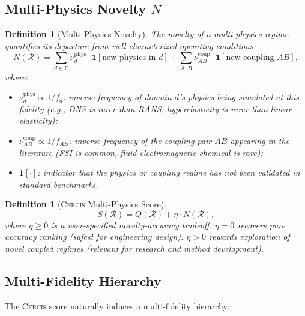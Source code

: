 \documentclass[11pt,a4paper]{article}
\newtheorem{definition}[theorem]{Definition}
\theoremstyle{definition}
\newcommand{\Cercis}{\textsc{Cercis}}
\newcommand{\ind}[1]{\mathbf{1}[#1]}
\newcommand{\domains}{\mathbb{D}}
\begin{document}
\subsection{Multi-Physics Novelty $N$}

\begin{definition}[Multi-Physics Novelty]\label{def:N_mp}
The novelty of a multi-physics regime quantifies its departure from well-characterized operating conditions:
\begin{equation}\label{eq:N_mp}
N(\mathcal{R}) = \sum_{d \in \domains} \nu_d^{\mathrm{phys}} \cdot \ind{\text{new physics in } d} + \sum_{A,B} \nu_{AB}^{\mathrm{coup}} \cdot \ind{\text{new coupling } AB},
\end{equation}
where:
\begin{itemize}
    \item $\nu_d^{\mathrm{phys}} \propto 1/f_d$: inverse frequency of domain $d$'s physics being simulated at this fidelity (e.g., DNS is rarer than RANS; hyperelasticity is rarer than linear elasticity);
    \item $\nu_{AB}^{\mathrm{coup}} \propto 1/f_{AB}$: inverse frequency of the coupling pair $AB$ appearing in the literature (FSI is common, fluid-electromagnetic-chemical is rare);
    \item $\ind{\cdot}$: indicator that the physics or coupling regime has not been validated in standard benchmarks.
\end{itemize}
\end{definition}

\begin{definition}[\Cercis{} Multi-Physics Score]\label{def:cercis_mp}
\begin{equation}\label{eq:S_mp}
S(\mathcal{R}) = Q(\mathcal{R}) + \eta \cdot N(\mathcal{R}),
\end{equation}
where $\eta \geq 0$ is a user-specified novelty-accuracy tradeoff. $\eta = 0$ recovers pure accuracy ranking (safest for engineering design). $\eta > 0$ rewards exploration of novel coupled regimes (relevant for research and method development).
\end{definition}

\subsection{Multi-Fidelity Hierarchy }

The \Cercis{} score naturally induces a multi-fidelity hierarchy:
\end{document}
